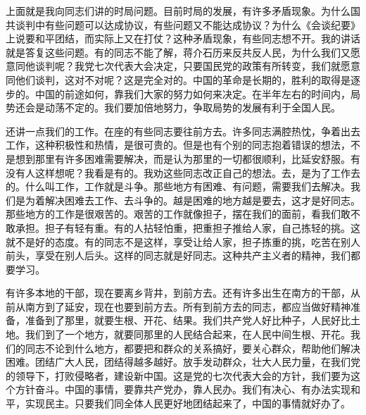 \documentclass[UTF-8, a5paper, 12pt]{ctexart}
\begin{document}
上面就是我向同志们讲的时局问题。目前时局的发展，有许多矛盾现象。为什么国共谈判中有些问题可以达成协议，有些问题又不能达成协议？为什么《会谈纪要》上说要和平团结，而实际上又在打仗？这种矛盾现象，有些同志想不开。我的讲话就是答复这些问题。有的同志不能了解，蒋介石历来反共反人民，为什么我们又愿意同他谈判呢？我党七次代表大会决定，只要国民党的政策有所转变，我们就愿意同他们谈判，这对不对呢？这是完全对的。中国的革命是长期的，胜利的取得是逐步的。中国的前途如何，靠我们大家的努力如何来决定。在半年左右的时间内，局势还会是动荡不定的。我们要加倍地努力，争取局势的发展有利于全国人民。

还讲一点我们的工作。在座的有些同志要往前方去。许多同志满腔热忱，争着出去工作，这种积极性和热情，是很可贵的。但是也有个别的同志抱着错误的想法，不是想到那里有许多困难需要解决，而是认为那里的一切都很顺利，比延安舒服。有没有人这样想呢？我看是有的。我劝这些同志改正自己的想法。去，是为了工作去的。什么叫工作，工作就是斗争。那些地方有困难、有问题，需要我们去解决。我们是为着解决困难去工作、去斗争的。越是困难的地方越是要去，这才是好同志。那些地方的工作是很艰苦的。艰苦的工作就像担子，摆在我们的面前，看我们敢不敢承担。担子有轻有重。有的人拈轻怕重，把重担子推给人家，自己拣轻的挑。这就不是好的态度。有的同志不是这样，享受让给人家，担子拣重的挑，吃苦在别人前头，享受在别人后头。这样的同志就是好同志。这种共产主义者的精神，我们都要学习。

有许多本地的干部，现在要离乡背井，到前方去。还有许多出生在南方的干部，从前从南方到了延安，现在也要到前方去。所有到前方去的同志，都应当做好精神准备，准备到了那里，就要生根、开花、结果。我们共产党人好比种子，人民好比土地。我们到了一个地方，就要同那里的人民结合起来，在人民中间生根、开花。我们的同志不论到什么地方，都要把和群众的关系搞好，要关心群众，帮助他们解决困难。团结广大人民，团结得越多越好。放手发动群众，壮大人民力量，在我们党的领导下，打败侵略者，建设新中国。这是党的七次代表大会的方针，我们要为这个方针奋斗。中国的事情，要靠共产党办，靠人民办。我们有决心、有办法实现和平，实现民主。只要我们同全体人民更好地团结起来了，中国的事情就好办了。
\end{document}
